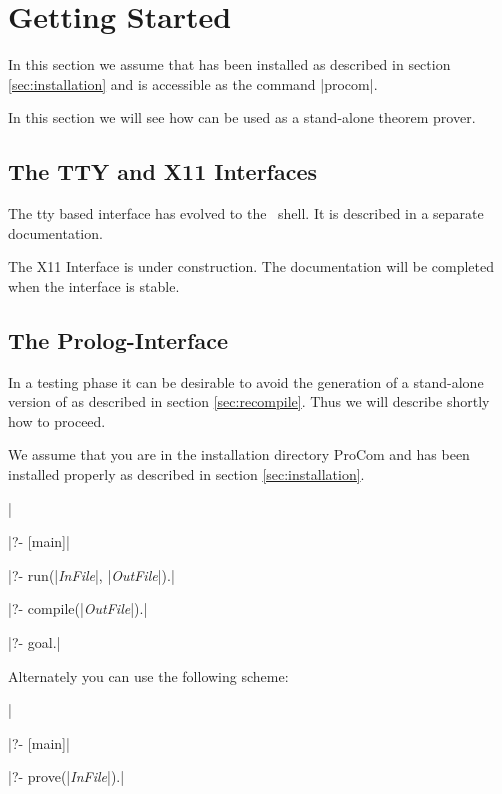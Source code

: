 
\section{Getting Started}

In this section we assume that \ProCom{} has been installed as described in
section \ref{sec:installation} and \ProCom{} is accessible as the command
|procom|.

In this section we will see how \ProCom{} can be used as a stand-alone theorem
prover. 

\subsection{The TTY and X11 Interfaces}

The tty based interface has evolved to the \ProTop\ shell. It is described in
a separate documentation.

The X11 Interface is under construction. The documentation will be completed
when the interface is stable.


\subsection{The Prolog-Interface}

In a testing phase it can be desirable to avoid the generation of a
stand-alone version of \ProCom{} as described in section \ref{sec:recompile}.
Thus we will describe shortly how to proceed.

We assume that you are in the \ProCom{} installation directory {\sf ProCom}
and \ProCom{} has been installed properly as described in section
\ref{sec:installation}.

|%

|?- [main]|

|?- run(|{\em InFile}|, |{\em OutFile}|).|

|?- compile(|{\em OutFile}|).|

|?- goal.|


Alternately you can use the following scheme:


|%

|?- [main]|

|?- prove(|{\em InFile}|).|